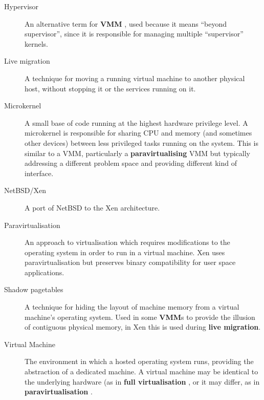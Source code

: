 \documentclass[11pt,twoside,final,openright]{xenstyle}
\begin{document}
{\begin{description}
\item[Hypervisor]          An alternative term for { \bf VMM }, used
                           because it means ``beyond supervisor'',
                           since it is responsible for managing multiple
                           ``supervisor'' kernels.

\item[Live migration]      A technique for moving a running virtual
                           machine to another physical host, without
			   stopping it or the services running on it.

\item[Microkernel]         A small base of code running at the highest
                           hardware privilege level.  A microkernel is
                           responsible for sharing CPU and memory (and
                           sometimes other devices) between less
                           privileged tasks running on the system.
                           This is similar to a VMM, particularly a
                           {\bf paravirtualising} VMM but typically
                           addressing a different problem space and
                           providing different kind of interface.

\item[NetBSD/Xen]          A port of NetBSD to the Xen architecture.

\item[Paravirtualisation]  An approach to virtualisation which requires
                           modifications to the operating system in
                           order to run in a virtual machine.  Xen
                           uses paravirtualisation but preserves
                           binary compatibility for user space
                           applications.

\item[Shadow pagetables]   A technique for hiding the layout of machine
                           memory from a virtual machine's operating
			   system.  Used in some {\bf VMM}s to provide
			   the illusion of contiguous physical memory,
			   in Xen this is used during
			   {\bf live migration}.

\item[Virtual Machine]     The environment in which a hosted operating
                           system runs, providing the abstraction of a
                           dedicated machine.  A virtual machine may
                           be identical to the underlying hardware (as
                           in { \bf full virtualisation }, or it may
                           differ, as in { \bf paravirtualisation }.


\end{description}}
\end{document}
